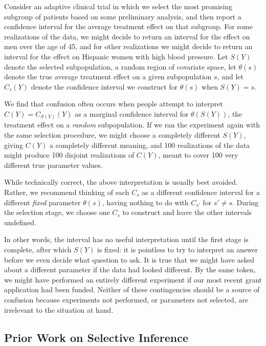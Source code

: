 \documentclass{article}
\theoremstyle{definition}
\begin{document}
Consider an adaptive clinical trial in which we select the most promising subgroup of patients based on some preliminary analysis, and then report a confidence interval for the average treatment effect on that subgroup. For some realizations of the data, we might decide to return an interval for the effect on men over the age of 45, and for other realizations we might decide to return an interval for the effect on Hispanic women with high blood pressure. Let $S(Y)$ denote the selected subpopulation, a random region of covariate space, let $\theta(s)$ denote the true average treatment effect on a given subpopulation $s$, and let $C_s(Y)$ denote the confidence interval we construct for $\theta(s)$ when $S(Y)=s$.

We find that confusion often occurs when people attempt to interpret $C(Y) = C_{S(Y)}(Y)$ as a marginal confidence interval for $\theta(S(Y))$, the treatment effect on a {\em random} subpopulation. If we ran the experiment again with the same selection procedure, we might choose a completely different $S(Y)$, giving $C(Y)$ a completely different meaning, and 100 realizations of the data might produce 100 disjoint realizations of $C(Y)$, meant to cover 100 very different true parameter values.

While technically correct, the above interpretation is usually best avoided. Rather, we recommend thinking of each $C_s$ as a different confidence interval for a different {\em fixed} parameter $\theta(s)$, having nothing to do with $C_{s'}$ for $s'\neq s$. During the selection stage, we choose one $C_s$ to construct and leave the other intervals undefined.

In other words, the interval has no useful interpretation until the first stage is complete, after which $S(Y)$ is fixed: it is pointless to try to interpret an answer before we even decide what question to ask. It is true that we might have asked about a different parameter if the data had looked different. By the same token, we might have performed an entirely different experiment if our most recent grant application had been funded. Neither of these contingencies should be a source of confusion because experiments not performed, or parameters not selected, are irrelevant to the situation at hand.


\subsection{Prior Work on Selective Inference}\label{sec:prior}
\end{document}
